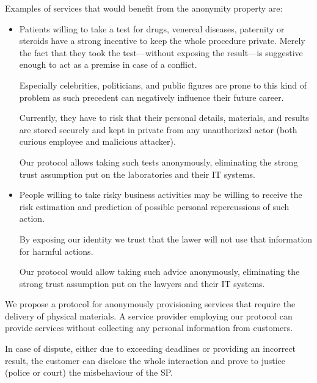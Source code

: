 \documentclass{ieeeaccess}
\begin{document}
Examples of services that would benefit from the anonymity property are:
\begin{itemize}
    \item Patients willing to take a test for drugs, venereal diseases, paternity or steroids have a strong incentive to keep the whole procedure private. Merely the fact that they took the test—without exposing the result—is suggestive enough to act as a premise in case of a conflict.

Especially celebrities, politicians, and public figures are prone to this kind of problem as such precedent can negatively influence their future career.

Currently, they have to risk that their personal details, materials, and results are stored securely and kept in private from any unauthorized actor (both curious employee and malicious attacker).

Our protocol allows taking such tests anonymously, eliminating the strong trust assumption put on the laboratories and their IT
systems.
\item People willing to take risky business activities may be willing to receive the risk estimation and prediction of possible personal repercussions of such action.

By exposing our identity we trust that the lawer will not use that information for harmful actions.

Our protocol would allow taking such advice anonymously, eliminating the strong trust assumption put on the lawyers and their IT systems.
\end{itemize}

We propose a protocol for anonymously provisioning services that require the delivery of physical materials. A service provider employing our protocol can provide services without collecting any personal information from customers.

In case of dispute, either due to exceeding deadlines or providing an incorrect result, the customer can disclose the whole interaction and prove to justice (police or court) the misbehaviour of the SP.
\end{document}
